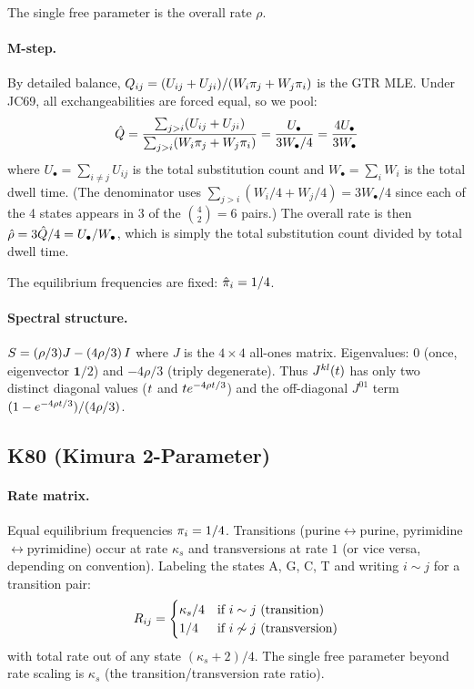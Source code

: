 The single free parameter is the overall rate $\rho$.

\paragraph{M-step.}
By detailed balance,
$Q_{ij} = (U_{ij} + U_{ji}) / (W_i \pi_j + W_j \pi_i)$
is the GTR MLE.
Under JC69, all exchangeabilities are forced equal, so we pool:
\begin{equation}
\label{eq:jc69-mstep}
\hat{Q} = \frac{\sum_{j>i}(U_{ij} + U_{ji})}
       {\sum_{j>i}(W_i \pi_j + W_j \pi_i)}
= \frac{U_{\bullet}}{3 W_{\bullet}/4}
= \frac{4 U_{\bullet}}{3 W_{\bullet}}
\end{equation}
where $U_\bullet = \sum_{i \neq j} U_{ij}$ is the total substitution count
and $W_\bullet = \sum_i W_i$ is the total dwell time.
(The denominator uses $\sum_{j>i}(W_i/4 + W_j/4) = 3W_\bullet/4$
since each of the 4 states appears in 3 of the $\binom{4}{2} = 6$ pairs.)
The overall rate is then $\hat{\rho} = 3\hat{Q}/4 = U_\bullet / W_\bullet$,
which is simply the total substitution count divided by total dwell time.

The equilibrium frequencies are fixed: $\hat{\pi}_i = 1/4$.

\paragraph{Spectral structure.}
$S = (\rho/3)J - (4\rho/3)\,I$ where $J$ is the $4 \times 4$ all-ones matrix.
Eigenvalues: $0$ (once, eigenvector $\mathbf{1}/2$) and $-4\rho/3$ (triply degenerate).
Thus $J^{kl}(t)$ has only two distinct diagonal values
($t$ and $t e^{-4\rho t/3}$)
and the off-diagonal $J^{01}$ term
$(1 - e^{-4\rho t/3})/(4\rho/3)$.


\subsection{K80 (Kimura 2-Parameter)}
\label{sec:mstep-k80}

\paragraph{Rate matrix.}
Equal equilibrium frequencies $\pi_i = 1/4$.
Transitions (purine$\leftrightarrow$purine, pyrimidine$\leftrightarrow$pyrimidine)
occur at rate $\kappa_s$ and transversions at rate $1$ (or vice versa,
depending on convention).
Labeling the states A, G, C, T and writing $i \sim j$ for a transition pair:
\[
R_{ij} = \begin{cases}
  \kappa_s / 4 & \text{if } i \sim j \text{ (transition)} \\
  1/4 & \text{if } i \not\sim j \text{ (transversion)}
\end{cases}
\]
with total rate out of any state $(\kappa_s + 2)/4$.
The single free parameter beyond rate scaling is $\kappa_s$ (the
transition/transversion rate ratio).

